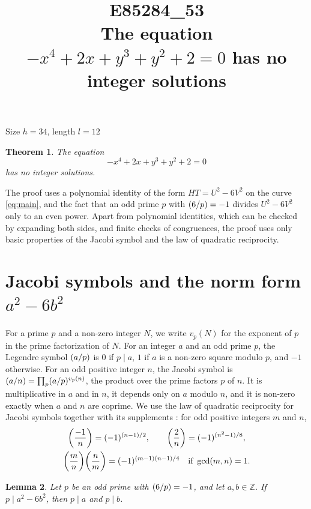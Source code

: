 \documentclass[11pt]{article}
\title{\textbf{E85284\_53}\\[4pt] {\Large The equation $-x^{4}+2x+y^{3}+y^{2}+2=0$ has no integer solutions}}
\author{}
\date{}
\newtheorem{theorem}{Theorem}
\newtheorem{lemma}[theorem]{Lemma}
\newcommand{\Z}{\mathbb{Z}}
\newcommand{\leg}[2]{\mathchoice{\biggl(\dfrac{#1}{#2}\biggr)}{(#1/#2)}{(#1/#2)}{(#1/#2)}}
\begin{document}
\maketitle
\vspace{-8ex}
\begin{center}
Size $h=34$, length $l=12$
\end{center}

\begin{theorem}\label{thm:main}
The equation
\begin{equation}\label{eq:main}
-x^{4}+2x+y^{3}+y^{2}+2=0
\end{equation}
has no integer solutions.
\end{theorem}

The proof uses a polynomial identity of the form $HT=U^2-6V^2$ on the curve \eqref{eq:main}, and the fact that an odd prime $p$ with $\leg{6}{p}=-1$ divides $U^2-6V^2$ only to an even power. Apart from polynomial identities, which can be checked by expanding both sides, and finite checks of congruences, the proof uses only basic properties of the Jacobi symbol and the law of quadratic reciprocity.

\section{\texorpdfstring{Jacobi symbols and the norm form $a^2-6b^2$}{Jacobi symbols and the norm form}}

For a prime $p$ and a non-zero integer $N$, we write $v_p(N)$ for the exponent of $p$ in the prime factorization of $N$. For an integer $a$ and an odd prime $p$, the Legendre symbol $\leg{a}{p}$ is $0$ if $p\mid a$, $1$ if $a$ is a non-zero square modulo $p$, and $-1$ otherwise. For an odd positive integer $n$, the Jacobi symbol is $\leg{a}{n}=\prod_p\leg{a}{p}^{v_p(n)}$, the product over the prime factors $p$ of $n$. It is multiplicative in $a$ and in $n$, it depends only on $a$ modulo $n$, and it is non-zero exactly when $a$ and $n$ are coprime. We use the law of quadratic reciprocity for Jacobi symbols together with its supplements \cite[Chapter~5, \S2]{IR}: for odd positive integers $m$ and $n$,
\begin{gather*}
\leg{-1}{n}=(-1)^{(n-1)/2},\qquad\leg{2}{n}=(-1)^{(n^2-1)/8},\\
\leg{m}{n}\leg{n}{m}=(-1)^{(m-1)(n-1)/4}\quad\text{if }\gcd(m,n)=1.
\end{gather*}

\begin{lemma}\label{lem:divides}
Let $p$ be an odd prime with $\leg{6}{p}=-1$, and let $a,b\in\Z$. If $p\mid a^2-6b^2$, then $p\mid a$ and $p\mid b$.
\end{lemma}
\end{document}
